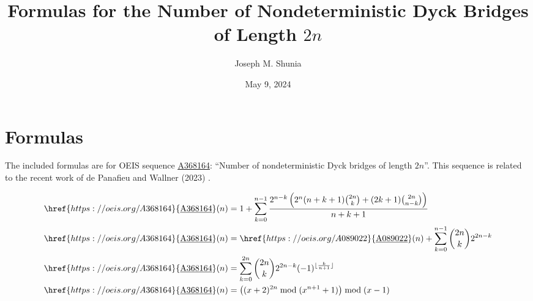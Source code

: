 \documentclass[11pt,reqno]{article}
\title{Formulas for the Number of Nondeterministic Dyck Bridges of Length $2n$}
\author{Joseph M. Shunia}
\date{May 9, 2024}
\newcommand{\seqnum}[1]{\href{https://oeis.org/#1}{\rm \underline{#1}}}
\begin{document}
\maketitle

\section{Formulas}
The included formulas are for OEIS sequence \seqnum{A368164}: ``Number of nondeterministic Dyck bridges of length $2n$''. This sequence is related to the recent work of de Panafieu and Wallner (2023) \cite{depanafieu2023combinatorics}.

\begin{align}
\seqnum{A368164}(n) &= 1 + \sum_{k=0}^{n-1} \frac{2^{n-k} \left(2^n (n+k+1) \binom{2n}{k} + (2k+1) \binom{2n}{n-k}\right)}{n+k+1} \\
\seqnum{A368164}(n) &= \seqnum{A089022}(n) + \sum_{k=0}^{n-1} \binom{2n}{k} 2^{2n-k} \\
\seqnum{A368164}(n) &= \sum_{k=0}^{2n} \binom{2n}{k} 2^{2n-k} (-1)^{\lfloor \frac{k}{n+1} \rfloor} \\
\seqnum{A368164}(n) &= \left((x+2)^{2n} \bmod (x^{n+1} + 1)\right) \bmod (x-1) 
\end{align}

\begingroup
\raggedright


\endgroup
\end{document}
